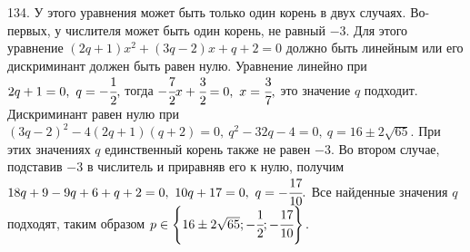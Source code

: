 134. У этого уравнения может быть только один корень в двух случаях. Во-первых, у числителя может быть один корень, не равный $-3.$ Для этого уравнение $(2q+1)x^2+(3q-2)x+q+2=0$ должно быть линейным или его дискриминант должен быть равен нулю. Уравнение линейно при $2q+1=0,\ q=-\cfrac{1}{2},$ тогда $-\cfrac{7}{2}x+\cfrac{3}{2}=0,\ x=\cfrac{3}{7},$ это значение $q$ подходит. Дискриминант равен нулю при $(3q-2)^2-4(2q+1)(q+2)=0,\ q^2-32q-4=0,\ q=16\pm2\sqrt{65}.$ При этих значениях $q$ единственный корень также не равен $-3.$ Во втором случае, подставив $-3$ в числитель и приравняв его к нулю, получим $18q+9-9q+6+q+2=0,\ 10q+17=0,\ q=-\cfrac{17}{10}.$ Все найденные значения $q$ подходят, таким образом $p\in\left\{16\pm2\sqrt{65};-\cfrac{1}{2};-\cfrac{17}{10}\right\}.$\\
